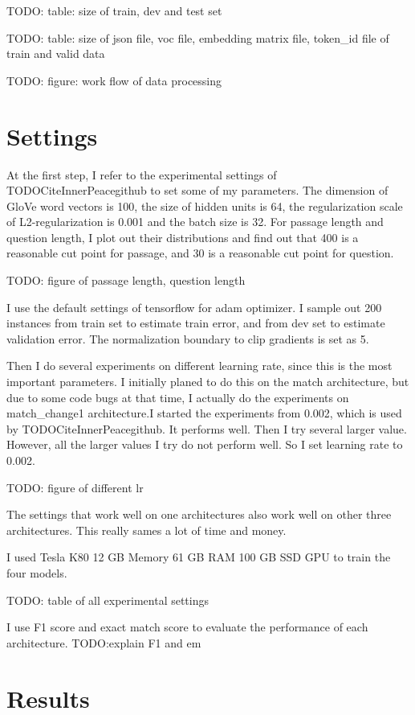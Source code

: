 \documentclass[modernstyle,12pt]{sjsuthesis}
\theoremstyle{definition}
\begin{document}
TODO: table: size of train, dev and test set

TODO: table: size of json file, voc file, embedding matrix file, token\_id file of train and valid data

TODO: figure: work flow of data processing

\section{Settings}
At the first step, I refer to the experimental settings of TODOCiteInnerPeacegithub to set some of my parameters. The dimension of GloVe word vectors is 100, the size of hidden units is 64, the regularization scale of L2-regularization is 0.001 and the batch size is 32. For passage length and question length, I plot out their distributions and find out that 400 is a reasonable cut point for passage, and 30 is a reasonable cut point for question.

TODO: figure of passage length, question length

I use the default settings of tensorflow for adam optimizer. I sample out 200 instances from train set to estimate train error, and from dev set to estimate validation error. The normalization boundary to clip gradients is set as 5.

Then I do several experiments on different learning rate, since this is the most important parameters. I initially planed to do this on the match architecture, but due to some code bugs at that time, I actually do the experiments on match\_change1 architecture.I started the experiments from 0.002, which is used by TODOCiteInnerPeacegithub. It performs well. Then I try several larger value. However, all the larger values I try do not perform well. So I set learning rate to 0.002.

TODO: figure of different lr


The settings that work well on one architectures also work well on other three architectures. This really sames a lot of time and money.

I used Tesla K80 12 GB Memory 61 GB RAM 100 GB SSD GPU to train the four models.

TODO: table of all experimental settings

I use F1 score and exact match score to evaluate the performance of each architecture. TODO:explain F1 and em


\section{Results}
\end{document}
